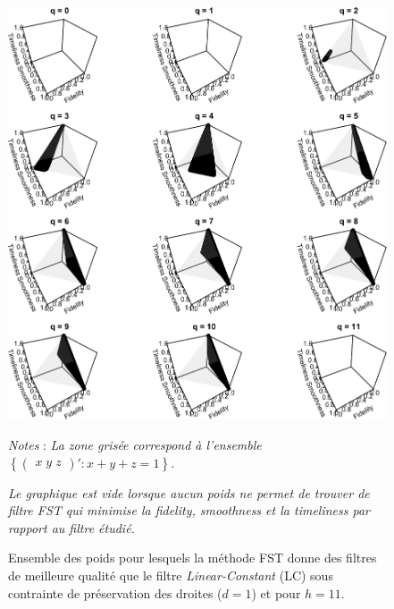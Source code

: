 \documentclass[
  11pt,
  french,
  a4paper]{article}
\newcommand\1{\mathds{1}}
\begin{document}
\begin{figure}[H]

{\centering \includegraphics{img/bookdown/pdf/lc11d1-1} 

}

\caption[Ensemble des poids pour lesquels la méthode FST donne des filtres de meilleure qualité que le filtre \emph{Linear-Constant} (LC) sous contrainte de préservation des droites (\(d=1\)) et pour \(h=11\)]{Ensemble des poids pour lesquels la méthode FST donne des filtres de meilleure qualité que le filtre \emph{Linear-Constant} (LC) sous contrainte de préservation des droites (\(d=1\)) et pour \(h=11\).}\label{fig:lc11d1}

\footnotesize


\emph{Notes} : \emph{La zone grisée correspond à l'ensemble \(\left\{\begin{pmatrix}x \; y \; z \end{pmatrix}' : x+y+z=1\right\}\).}

\emph{Le graphique est vide lorsque aucun poids ne permet de trouver de filtre FST qui minimise la \emph{fidelity}, \emph{smoothness} et la \emph{timeliness} par rapport au filtre étudié.}
\normalsize\end{figure}
\end{document}
